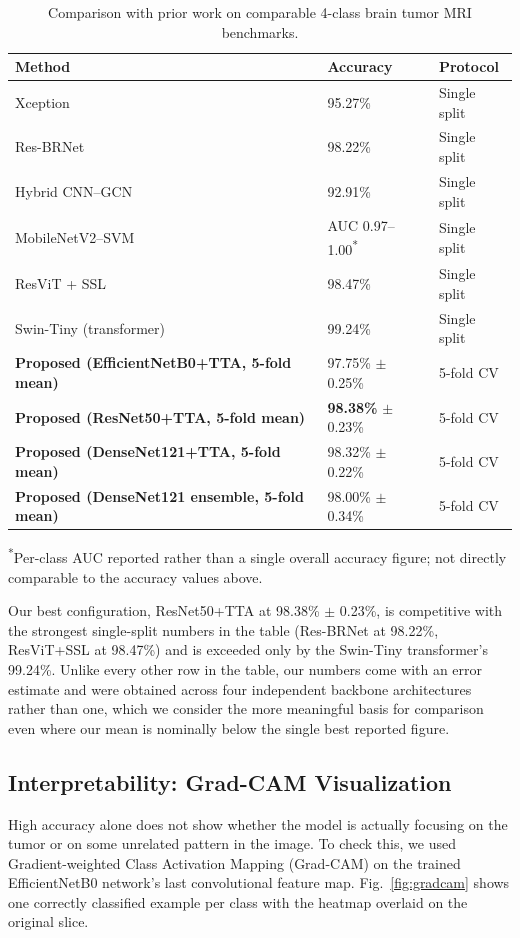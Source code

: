 \documentclass[11pt]{article}
\begin{document}
\begin{table}[htbp]
\centering
\caption{Comparison with prior work on comparable 4-class brain tumor MRI benchmarks.}
\label{tab:sota_comparison}
\small
\begin{tabular}{@{}p{5.0cm}p{2.3cm}p{2.8cm}@{}}
\toprule
\textbf{Method} & \textbf{Accuracy} & \textbf{Protocol} \\
\midrule
Xception \cite{disci2025advanced} & 95.27\% & Single split \\
Res-BRNet \cite{zahoor2024resbrnet} & 98.22\% & Single split \\
Hybrid CNN--GCN \cite{cnngcn2024hybrid} & 92.91\% & Single split \\
MobileNetV2--SVM \cite{adamu2024mobilenetsvm} & AUC 0.97--1.00\textsuperscript{*} & Single split \\
ResViT + SSL \cite{r19} & 98.47\% & Single split \\
Swin-Tiny (transformer) \cite{gomezguzman2025swin} & 99.24\% & Single split \\
\textbf{Proposed (EfficientNetB0+TTA, 5-fold mean)} & 97.75\% $\pm$ 0.25\% & 5-fold CV \\
\textbf{Proposed (ResNet50+TTA, 5-fold mean)} & \textbf{98.38\%} $\pm$ 0.23\% & 5-fold CV \\
\textbf{Proposed (DenseNet121+TTA, 5-fold mean)} & 98.32\% $\pm$ 0.22\% & 5-fold CV \\
\textbf{Proposed (DenseNet121 ensemble, 5-fold mean)} & 98.00\% $\pm$ 0.34\% & 5-fold CV \\
\bottomrule
\end{tabular}

\vspace{1mm}
{\footnotesize \textsuperscript{*}Per-class AUC reported rather than a single overall accuracy figure; not directly comparable to the accuracy values above.}
\end{table}

Our best configuration, ResNet50+TTA at 98.38\% $\pm$ 0.23\%, is competitive with the strongest single-split numbers in the table (Res-BRNet at 98.22\%, ResViT+SSL at 98.47\%) and is exceeded only by the Swin-Tiny transformer's 99.24\%. Unlike every other row in the table, our numbers come with an error estimate and were obtained across four independent backbone architectures rather than one, which we consider the more meaningful basis for comparison even where our mean is nominally below the single best reported figure.

\subsection{Interpretability: Grad-CAM Visualization}
\label{sec:gradcam}
High accuracy alone does not show whether the model is actually focusing on the tumor or on some unrelated pattern in the image. To check this, we used Gradient-weighted Class Activation Mapping (Grad-CAM) \cite{selvaraju2017gradcam} on the trained EfficientNetB0 network's last convolutional feature map. Fig.~\ref{fig:gradcam} shows one correctly classified example per class with the heatmap overlaid on the original slice.
\end{document}
